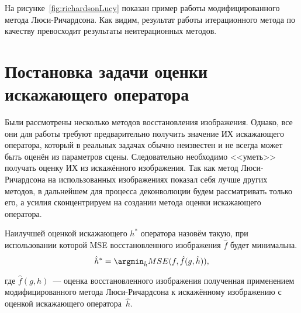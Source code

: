 На рисунке~\ref{fig:richardsonLucy} показан пример работы модифицированного метода Люси-Ричардсона. Как видим, результат работы итерационного метода по качеству превосходит результаты неитерационных методов.


\begin{comment}
\subsection{Слепая деконволюция}
\end{comment}

\section{Постановка задачи оценки искажающего оператора}
Были рассмотрены несколько методов восстановления изображения. Однако, все они для работы требуют предварительно получить значение ИХ искажающего оператора, который в реальных задачах обычно неизвестен и не всегда может быть оценён из параметров сцены. Следовательно необходимо  <<уметь>> получать оценку ИХ из искажённого изображения. Так как метод Люси-Ричардсона на использованных изображениях показал себя лучше других методов, в дальнейшем для процесса деконволюции будем рассматривать только его, а усилия сконцентрируем на создании метода оценки искажающего оператора.
\begin{definition}\label{def:bestPsfEstimaton}
	Наилучшей оценкой искажающего $h^*$ оператора назовём такую, при использовании которой MSE восстановленного изображения $\hat{f}$ будет минимальна.
	\begin{equation}\label{eq:bestPsf}
	\hat{h}^* = \argmin_{\hat{h}}MSE(f, \hat{f}(g,\hat{h})),
	\end{equation}
\end{definition}
где $\hat{f}(g,h)$~--- оценка восстановленного изображения полученная применением модифицированного метода Люси-Ричардсона к искажённому изображению с оценкой искажающего оператора~$\hat{h}$. 
